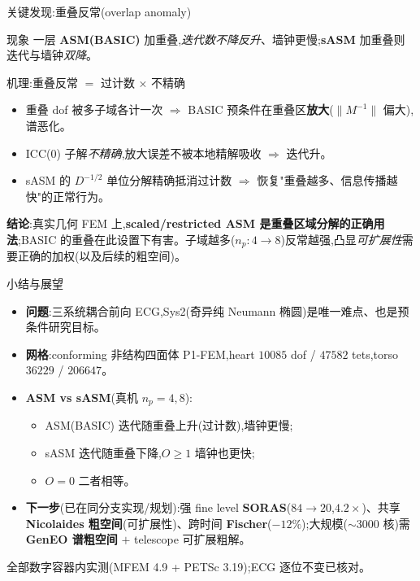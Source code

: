 \documentclass[aspectratio=169,11pt,fontset=fandol]{ctexbeamer}
\begin{document}
\begin{frame}{关键发现:重叠反常(overlap anomaly)}
\begin{block}{现象}
一层 \textbf{ASM(BASIC)} 加重叠,\emph{迭代数不降反升}、墙钟更慢;\textbf{sASM} 加重叠则迭代与墙钟\emph{双降}。
\end{block}
\begin{block}{机理:重叠反常 $=$ 过计数 $\times$ 不精确}
\begin{itemize}
\item 重叠 dof 被多子域各计一次 $\Rightarrow$ BASIC 预条件在重叠区\textbf{放大}($\|M^{-1}\|$ 偏大),谱恶化。
\item ICC(0) 子解\emph{不精确},放大误差不被本地精解吸收 $\Rightarrow$ 迭代升。
\item sASM 的 $D^{-1/2}$ 单位分解精确抵消过计数 $\Rightarrow$ 恢复"重叠越多、信息传播越快"的正常行为。
\end{itemize}
\end{block}
\textbf{结论}:真实几何 FEM 上,\textbf{scaled/restricted ASM 是重叠区域分解的正确用法};BASIC 的重叠在此设置下有害。子域越多($n_p{:}4{\to}8$)反常越强,凸显\emph{可扩展性}需要正确的加权(以及后续的粗空间)。
\end{frame}

\begin{frame}{小结与展望}
\begin{itemize}
\item \textbf{问题}:三系统耦合前向 ECG,Sys2(奇异纯 Neumann 椭圆)是唯一难点、也是预条件研究目标。
\item \textbf{网格}:conforming 非结构四面体 P1-FEM,heart $10085$ dof / $47582$ tets,torso $36229$ / $206647$。
\item \textbf{ASM vs sASM}(真机 $n_p{=}4,8$):
  \begin{itemize}
  \item ASM(BASIC) 迭代\textcolor{bad}{随重叠上升}(过计数),墙钟更慢;
  \item sASM 迭代\textcolor{good}{随重叠下降},$O{\ge}1$ 墙钟也更快;
  \item $O{=}0$ 二者相等。
  \end{itemize}
\item \textbf{下一步}(已在同分支实现/规划):强 fine level \textbf{SORAS}($84{\to}20$,$4.2\times$)、共享 \textbf{Nicolaides 粗空间}(可扩展性)、跨时间 \textbf{Fischer}($-12\%$);大规模($\sim$3000 核)需 \textbf{GenEO 谱粗空间} $+$ telescope 可扩展粗解。
\end{itemize}
\vspace{0.4em}
\centering\footnotesize 全部数字容器内实测(MFEM 4.9 + PETSc 3.19);ECG 逐位不变已核对。
\end{frame}
\end{document}
